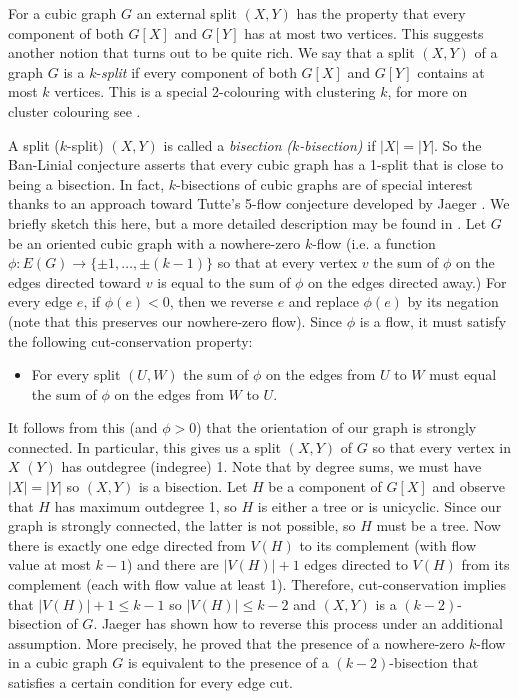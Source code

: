 \documentclass[12pt]{article}
\begin{document}
For a cubic graph $G$ an external split $(X,Y)$ has the property that every component of both $G[X]$ and $G[Y]$ has at most two vertices.  This suggests another notion that turns out to be quite rich.  We say that a split $(X,Y)$ of a graph $G$ is a $k$-\emph{split} if every component of both $G[X]$ and $G[Y]$ contains at most $k$ vertices. This is a special 2-colouring with clustering $k$, for more on cluster colouring see \cite{WoodSurv}. 

A split ($k$-split) $(X,Y)$ is called a \emph{bisection} \emph{($k$-bisection)} if $|X| = |Y|$.  So the Ban-Linial conjecture asserts that every cubic graph has a 1-split that is close to being a bisection.  In fact, $k$-bisections of cubic graphs are of special interest thanks to an approach toward Tutte's 5-flow conjecture developed by Jaeger \cite{6eaa05ae-624e-36ea-92fc-663066b4cf0a}.  We briefly sketch this here, but a more detailed description may be found in \cite{EsperetL.2017FaBi}.  Let $G$ be an oriented cubic graph with a nowhere-zero $k$-flow (i.e. a function $\phi : E(G) \rightarrow \{ \pm 1, \ldots, \pm (k-1) \}$ so that at every vertex $v$ the sum of $\phi$ on the edges directed toward $v$ is equal to the sum of $\phi$ on the edges directed away.)  For every edge $e$, if $\phi(e) < 0$, then we reverse $e$ and replace $\phi(e)$ by its negation (note that this preserves our nowhere-zero flow).  Since $\phi$ is a flow, it must satisfy the following cut-conservation property:
\begin{itemize}
\item For every split $(U,W)$ the sum of $\phi$ on the edges from $U$ to $W$ must equal the sum of $\phi$ on the edges from $W$ to $U$.  
\end{itemize}
It follows from this (and $\phi > 0$) that the orientation of our graph is strongly connected.  In particular, this gives us a split $(X,Y)$ of $G$ so that every vertex in $X$ $(Y)$ has outdegree (indegree) 1.  Note that by degree sums, we must have $|X| = |Y|$ so $(X,Y)$ is a bisection.  Let $H$ be a component of $G[X]$ and observe that $H$ has maximum outdegree 1, so $H$ is either a tree or is unicyclic.  Since our graph is strongly connected, the latter is not possible, so $H$ must be a tree.  Now there is exactly one edge directed from $V(H)$ to its complement (with flow value at most $k-1$) and there are $|V(H)| + 1$ edges directed to $V(H)$ from its complement (each with flow value at least 1).  Therefore, cut-conservation implies that $|V(H)| + 1 \le k-1$ so $|V(H)| \le k-2$ and $(X,Y)$ is a $(k-2)$-bisection of $G$.  Jaeger has shown how to reverse this process under an additional assumption.  More precisely, he proved that the presence of a nowhere-zero $k$-flow in a cubic graph $G$ is equivalent to the presence of a $(k-2)$-bisection that satisfies a certain condition for every edge cut.  
\end{document}
